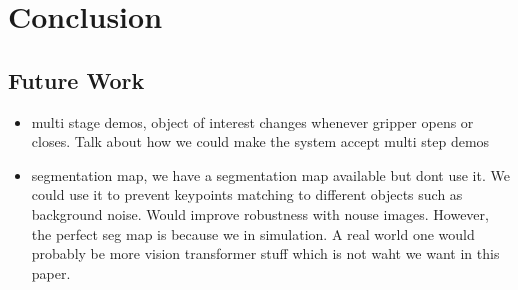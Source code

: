\chapter{Conclusion}


\section{Future Work}
\begin{itemize}
    \item multi stage demos, object of interest changes whenever gripper opens or closes. Talk about how we could make the system accept multi step demos

    \item segmentation map, we have a segmentation map available but dont use it. We could use it to prevent keypoints matching to different objects such as background noise. Would improve robustness with nouse images. However, the perfect seg map is because we in simulation. A real world one would probably be more vision transformer stuff which is not waht we want in this paper.
\end{itemize}